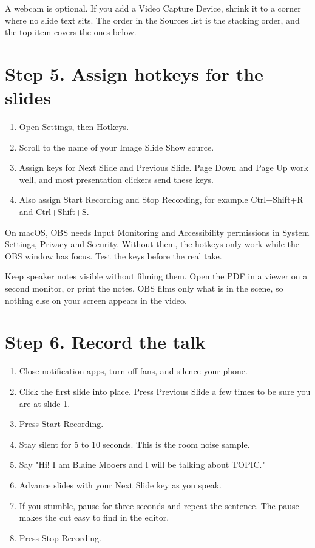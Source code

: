 \documentclass[11pt]{article}
\begin{document}
A webcam is optional. If you add a Video Capture Device, shrink it to a corner where no slide text sits. The order in the Sources list is the stacking order, and the top item covers the ones below.
\section*{Step 5. Assign hotkeys for the slides}
\label{sec:org5eee6cb}

\begin{enumerate}
\item Open Settings, then Hotkeys.
\item Scroll to the name of your Image Slide Show source.
\item Assign keys for Next Slide and Previous Slide. Page Down and Page Up work well, and most presentation clickers send these keys.
\item Also assign Start Recording and Stop Recording, for example Ctrl+Shift+R and Ctrl+Shift+S.
\end{enumerate}

On macOS, OBS needs Input Monitoring and Accessibility permissions in System Settings, Privacy and Security. Without them, the hotkeys only work while the OBS window has focus. Test the keys before the real take.

Keep speaker notes visible without filming them. Open the PDF in a viewer on a second monitor, or print the notes. OBS films only what is in the scene, so nothing else on your screen appears in the video.
\section*{Step 6. Record the talk}
\label{sec:orge822153}

\begin{enumerate}
\item Close notification apps, turn off fans, and silence your phone.
\item Click the first slide into place. Press Previous Slide a few times to be sure you are at slide 1.
\item Press Start Recording.
\item Stay silent for 5 to 10 seconds. This is the room noise sample.
\item Say "Hi! I am Blaine Mooers and I will be talking about TOPIC."
\item Advance slides with your Next Slide key as you speak.
\item If you stumble, pause for three seconds and repeat the sentence. The pause makes the cut easy to find in the editor.
\item Press Stop Recording.
\end{enumerate}
\end{document}
